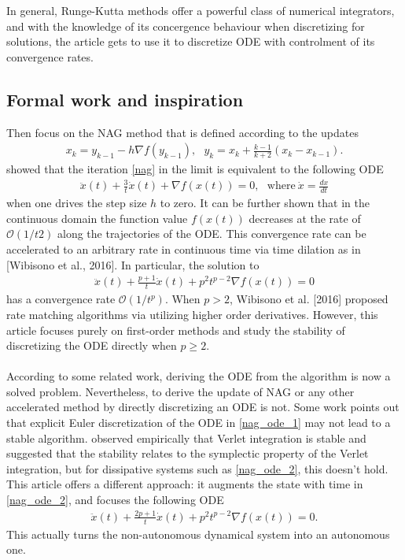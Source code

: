In general, Runge-Kutta methods offer a powerful class of numerical integrators, and with the knowledge
of its concergence behaviour when discretizing for solutions, the article gets to use it
to discretize ODE with controlment of its convergence rates.

\subsection{Formal work and inspiration}

Then focus on the NAG method that is defined according to the updates
\begin{align}\label{nag}
  x_{k} = y_{k-1} - h \nabla f(y_{k-1}),\ \ \ y_{k} = x_{k} + \frac{k-1}{k+2} (x_{k} - x_{k-1}).
\end{align}
\textcite{JMLR:v17:15-084} showed that the iteration \eqref{nag} in the limit is equivalent to the
following ODE
\begin{align}\label{nag_ode_1}
  \ddot{x}(t) + \frac{3}{t} \dot{x}(t) + \nabla f(x(t)) = 0,\ \ \ \mathrm{where\ }
  \dot{x} = \frac{dx}{dt}
\end{align}
when one drives the step size $h$ to zero. It can be further shown that in the
continuous domain the function value $f(x(t))$ decreases at the rate of $\mathcal{O}(1/t2)$
along the trajectories of the ODE. This convergence rate can be accelerated to an
arbitrary rate in continuous time via time dilation as in [Wibisono et al., 2016].
In particular, the solution to
\begin{align}\label{nag_ode_2}
  \ddot{x}(t) + \frac{p+1}{t} \dot{x}(t) + p^{2}t^{p-2} \nabla f(x(t)) = 0
\end{align}
has a convergence rate $\mathcal{O}(1/t^{p})$. When $p > 2$, Wibisono et al. [2016] proposed rate matching
algorithms via utilizing higher order derivatives. However, this article focuses purely on
first-order methods and study the stability of discretizing the ODE directly when
$p \geq 2$.
\\\\According to some related work, deriving the ODE from the algorithm is now a solved
problem. Nevertheless, to derive the update of NAG or any other
accelerated method by directly discretizing an ODE is not. Some work points out that
explicit Euler discretization of the ODE in \eqref{nag_ode_1} may not lead to a stable
algorithm. \textcite{https://doi.org/10.48550/arxiv.1802.03653} observed empirically that Verlet
integration is stable and suggested that the stability relates to the symplectic
property of the Verlet integration, but for dissipative systems such as \eqref{nag_ode_2},
this doesn't hold. This article offers a different approach: it augments the state with
time in \eqref{nag_ode_2}, and focuses the following ODE
\begin{align}\label{nag_ode_final}
  \ddot{x}(t) + \frac{2p+1}{t} \dot{x}(t) + p^{2}t^{p-2} \nabla f(x(t)) = 0.
\end{align}
This actually turns the non-autonomous dynamical system into an autonomous one.

